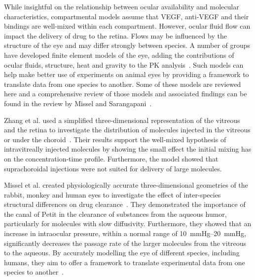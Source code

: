 \documentclass[12pt,a4paper]{journal}
\begin{document}
While insightful on the relationship between ocular availability and molecular characteristics, compartmental models assume that VEGF, anti-VEGF and their bindings are well-mixed within each compartment.
However, ocular fluid flow can impact the delivery of drug to the retina.
Flows may be influenced by the structure of the eye and may differ strongly between species.
A number of groups have developed finite element models of the eye, adding the contributions of ocular fluids, structure, heat and gravity to the PK analysis~\cite{Lamminsalo_2018, Missel_2012, Zhang_2018}.
Such models can help make better use of experiments on animal eyes by providing a framework to translate data from one species to another.
Some of these models are reviewed here and a comprehensive review of those models and associated findings can be found in the review by Missel and Sarangapani~\cite{Missel_2019}.

Zhang et al. used a simplified three-dimensional representation of the vitreous and the retina to investigate the distribution of molecules injected in the vitreous or under the choroid~\cite{Zhang_2018}.
Their results support the well-mixed hypothesis of intravitreally injected molecules by showing the small effect the initial mixing has on the concentration-time profile.
Furthermore, the model showed that suprachoroidal injections were not suited for delivery of large molecules.

Missel et al. created physiologically accurate three-dimensional geometries of the rabbit, monkey and human eyes to investigate the effect of inter-species structural differences on drug clearance~\cite{Missel_2012}.  
They demonstrated the importance of the canal of Petit in the clearance of substances from the aqueous humor, particularly for molecules with slow diffusivity. 
Furthermore, they showed that an increase in intraocular pressure, within a normal range of \SIrange[range-units = single]{10}{20}{\mmHg}, significantly decreases the passage rate of the larger molecules from the vitreous to the aqueous.
By accurately modelling the eye of different species, including humans, they aim to offer a framework to translate experimental data from one species to another~\cite{Missel_2012}.
\end{document}
